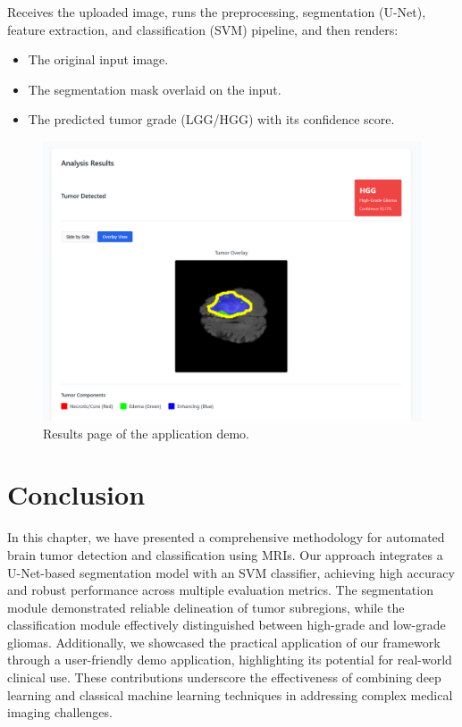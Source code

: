 Receives the uploaded image, runs the preprocessing, segmentation (U-Net), feature extraction, and classification (SVM) pipeline, and then renders:
\begin{itemize}
  \item The original input image.
  \item The segmentation mask overlaid on the input.
  \item The predicted tumor grade (LGG/HGG) with its confidence score.
\end{itemize}
\begin{figure}[H]
  \centering
  \includegraphics[width=1\textwidth]{Images/Chapter3/app_result.png}
  \caption{Results page of the application demo.}
  \label{fig:demo-results}
\end{figure}

\section{Conclusion}
\label{sec:contribution-conclusion}

In this chapter, we have presented a comprehensive methodology for automated brain tumor detection and classification using MRIs. Our approach integrates a U-Net-based segmentation model with an SVM classifier, achieving high accuracy and robust performance across multiple evaluation metrics. The segmentation module demonstrated reliable delineation of tumor subregions, while the classification module effectively distinguished between high-grade and low-grade gliomas. Additionally, we showcased the practical application of our framework through a user-friendly demo application, highlighting its potential for real-world clinical use. These contributions underscore the effectiveness of combining deep learning and classical machine learning techniques in addressing complex medical imaging challenges.



